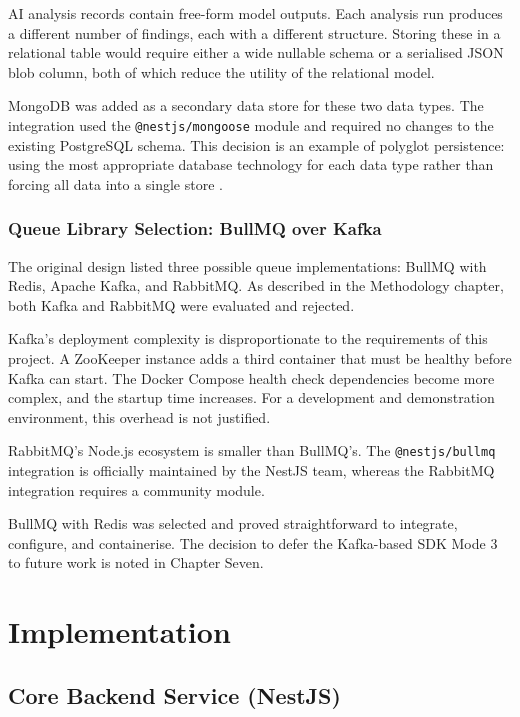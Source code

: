 \documentclass[a4paper,12pt,onecolumn]{report}
\begin{document}
AI analysis records contain free-form model outputs.
Each analysis run produces a different number of findings, each with a different structure.
Storing these in a relational table would require either a wide nullable schema or a serialised JSON blob column, both of which reduce the utility of the relational model.

MongoDB was added as a secondary data store for these two data types.
The integration used the \texttt{@nestjs/mongoose} module and required no changes to the existing PostgreSQL schema.
This decision is an example of polyglot persistence: using the most appropriate database technology for each data type rather than forcing all data into a single store \cite{microservices}.

\subsection{Queue Library Selection: BullMQ over Kafka}

The original design listed three possible queue implementations: BullMQ with Redis, Apache Kafka, and RabbitMQ.
As described in the Methodology chapter, both Kafka and RabbitMQ were evaluated and rejected.

Kafka's deployment complexity is disproportionate to the requirements of this project.
A ZooKeeper instance adds a third container that must be healthy before Kafka can start.
The Docker Compose health check dependencies become more complex, and the startup time increases.
For a development and demonstration environment, this overhead is not justified.

RabbitMQ's Node.js ecosystem is smaller than BullMQ's.
The \texttt{@nestjs/bullmq} integration is officially maintained by the NestJS team, whereas the RabbitMQ integration requires a community module.

BullMQ with Redis was selected and proved straightforward to integrate, configure, and containerise.
The decision to defer the Kafka-based SDK Mode 3 to future work is noted in Chapter Seven.


\chapter{Implementation}

\section{Core Backend Service (NestJS)}
\end{document}
